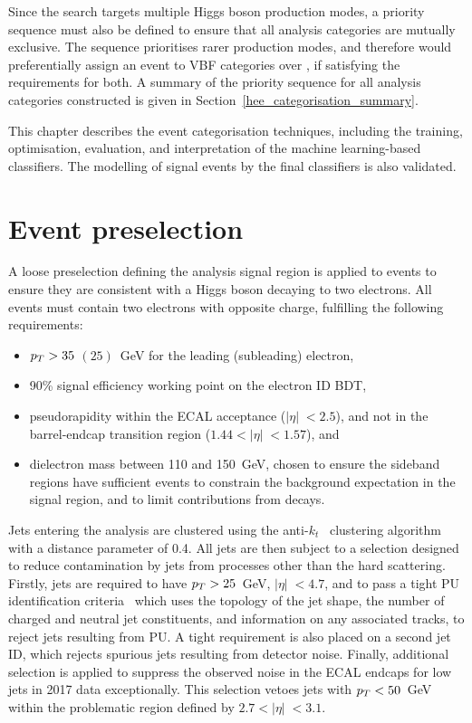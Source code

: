 Since the search targets multiple Higgs boson production modes, a priority sequence must also be defined to ensure that all analysis categories are mutually exclusive. The sequence prioritises rarer production modes, and therefore would preferentially assign an event to VBF categories over \ggH, if satisfying the requirements for both. A summary of the priority sequence for all analysis categories constructed is given in Section~\ref{hee_categorisation_summary}.

This chapter describes the event categorisation techniques, including the training, optimisation, evaluation, and interpretation of the machine learning-based classifiers. The modelling of signal events by the final classifiers is also validated.



\section{Event preselection}
\label{subsec:hee_preselection}

A loose preselection defining the analysis signal region is applied to events to ensure they are consistent with a Higgs boson decaying to two electrons. All events must contain two electrons with opposite charge, fulfilling the following requirements:

\begin{itemize}
    \item $p_T > 35$ $(25)$~GeV for the leading (subleading) electron,
    \item 90\% signal efficiency working point on the electron ID BDT,
    \item pseudorapidity within the ECAL acceptance ($|\eta|\;<2.5$), and not in the barrel-endcap transition region ($1.44<|\eta|\;<1.57$), and
    \item dielectron mass between 110 and 150~GeV, chosen to ensure the \mee sideband regions have sufficient events to constrain the background expectation in the signal region, and to limit contributions from \Zee decays.
\end{itemize}

\noindent Jets entering the analysis are clustered using the anti-$k_{t}$~\cite{anti-kt} clustering algorithm with a distance parameter of 0.4. All jets are then subject to a selection designed to reduce contamination by jets from processes other than the hard scattering. Firstly, jets are required to have $p_T>25$~GeV, $|\eta|\; < 4.7$, and to pass a tight PU identification criteria~\cite{PUJID} which uses the topology of the jet shape, the number of charged and neutral jet constituents, and information on any associated tracks, to reject jets resulting from PU. %
A tight requirement is also placed on a second jet ID, which rejects spurious jets resulting from detector noise. Finally, additional selection is applied to suppress the observed noise in the ECAL endcaps for low \pt jets in 2017 data exceptionally. This selection vetoes jets with $p_T<50$~GeV within the problematic region defined by $2.7<|\eta|\;<3.1$.


